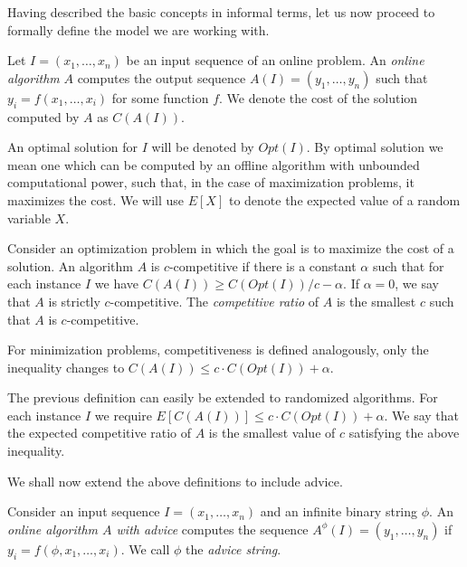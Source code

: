 Having described the basic concepts in informal terms, let us now proceed
to formally define the model we are working with.

\begin{definition}\label{def:online-algorithm}
    Let $I = (x_1, \dots, x_n)$ be an input sequence of an online problem.
    An \emph{online algorithm} $A$ computes the output sequence $A(I) =
    (y_1, \dots, y_n)$ such that $y_i = f(x_1, \dots, x_i)$ for some
    function $f$. We denote the cost of the solution computed by $A$ as
    $C(A(I))$.
\end{definition}

An optimal solution for $I$ will be denoted by $Opt(I)$. By optimal
solution we mean one which can be computed by an offline algorithm with
unbounded computational power, such that, in the case of maximization
problems, it maximizes the cost. We will use $E[X]$ to denote the expected
value of a random variable $X$.

\begin{definition}\label{def:competitive-ratio}
    Consider an optimization problem in which the goal is to maximize the
    cost of a solution. An algorithm $A$ is $c$-competitive if there is a
    constant $\alpha$ such that for each instance $I$ we have $C(A(I))
    \geq C(Opt(I)) / c - \alpha$. If $\alpha = 0$, we say that $A$ is
    strictly $c$-competitive. The \emph{competitive ratio} of $A$ is the
    smallest $c$ such that $A$ is $c$-competitive.
\end{definition}

For minimization problems, competitiveness is defined analogously, only
the inequality changes to $C(A(I)) \leq c \cdot C(Opt(I)) + \alpha$.

The previous definition can easily be extended to randomized algorithms.
For each instance $I$ we require $E[C(A(I))] \leq c \cdot C(Opt(I)) +
\alpha$. We say that the expected competitive ratio of $A$ is the smallest
value of $c$ satisfying the above inequality.

We shall now extend the above definitions to include advice.

\begin{definition}\label{def:online-advice}
    Consider an input sequence $I = (x_1, \dots, x_n)$ and an infinite
    binary string $\phi$.  An \emph{online algorithm $A$ with advice}
    computes the sequence $A^\phi(I) = (y_1, \dots, y_n)$ if $y_i =
    f(\phi, x_1, \dots, x_i)$. We call $\phi$ the \emph{advice string}.
\end{definition}

